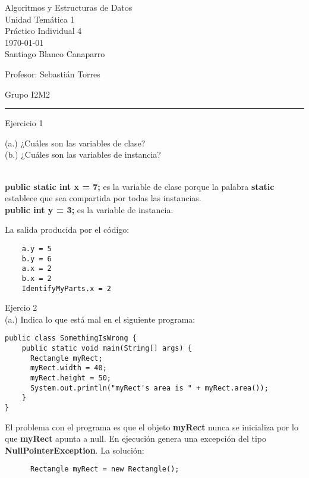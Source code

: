 \documentclass[12pt,letterpaper, onecolumn]{exam}
\begin{document}
\begingroup  
    \centering
    \LARGE Algoritmos y Estructuras de Datos\\
    \large Unidad Temática 1\\
    \large Práctico Individual 4\\[0.5em]
    \normalsize \today\\[0.5em]
    \normalsize Santiago Blanco Canaparro\par
    \normalsize Profesor: Sebastián Torres\par
    \normalsize Grupo I2M2\par
\endgroup
\rule{\textwidth}{0.4pt}
\pointsdroppedatright   %
\printanswers
\renewcommand{\solutiontitle}{\noindent\textbf{Respuesta:}\enspace}   %

\begin{questions}

    \question[] Ejercicio 1\droppoints
    
(a.) ¿Cuáles son las variables de clase? \\
    (b.) ¿Cuáles son las variables de instancia?
    \begin{solution}
      \\
      \textbf{public static int x = 7;} es la variable de clase porque la palabra \textbf{static} establece que sea compartida por todas las instancias.\\
      \textbf{public int y = 3;} es la variable de instancia.
    \end{solution}

    La salida producida por el código:
    \begin{solution}
    \begin{verbatim}
    a.y = 5
    b.y = 6
    a.x = 2
    b.x = 2
    IdentifyMyParts.x = 2
    \end{verbatim}
    \end{solution}
    
    \question[] Ejercio 2\\
    (a.) Indica lo que está mal en el siguiente programa:
    \begin{verbatim}
public class SomethingIsWrong {
    public static void main(String[] args) {
      Rectangle myRect;
      myRect.width = 40;
      myRect.height = 50;
      System.out.println("myRect's area is " + myRect.area());
    }
}
    \end{verbatim}
    
       
    \begin{solution}
      El problema con el programa es que el objeto \textbf{myRect} nunca se inicializa por lo que \textbf{myRect} apunta a null. En ejecución genera una excepción del tipo \textbf{NullPointerException}.
      La solución:
      \begin{verbatim}
      Rectangle myRect = new Rectangle();
      \end{verbatim}


\end{solution}
\end{questions}
\end{document}
